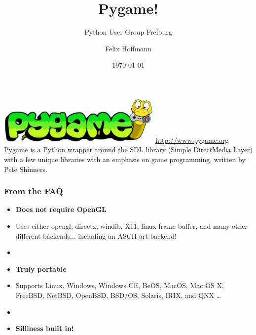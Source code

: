 \documentclass[]{beamer}   %
\title{Pygame!}
\subtitle{Python User Group Freiburg}
\author[Felix Hoffmann]{Felix Hoffmann}
\institute{\url{http://about.me/felixhoffmann}}
\date{\today}
\begin{document}






\begin{frame}[plain]
  \titlepage
\end{frame}




\begin{frame}[plain]
\begin{center}
\includegraphics[width=0.6\textwidth]{img/pygame.png}
\vspace{1cm}
\url{http://www.pygame.org}\\
\vspace{1.4cm}
Pygame is a Python wrapper around the SDL library (Simple DirectMedia Layer) with a few unique libraries with an emphasis on game programming, written by Pete Shinners.
\end{center}
\end{frame}


\begin{frame}

\frametitle{From the FAQ}

\begin{itemize}

\item[] \textbf{Does not require OpenGL} 
\item[] Uses either opengl, directx, windib, X11, linux frame buffer, and many other different backends... including an ASCII art backend!
\item[]
\item[] \textbf{Truly portable}
\item[] Supports Linux, Windows, Windows CE, BeOS, MacOS, Mac OS X, FreeBSD, NetBSD, OpenBSD, BSD/OS, Solaris, IRIX, and QNX \dots
\item[]
\item[] \textbf{Silliness built in!}
\end{itemize}
\end{frame}
\end{document}
